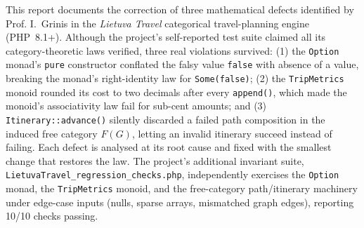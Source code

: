 This report documents the correction of three mathematical defects identified by Prof. I.~Grinis in the \emph{Lietuva Travel} categorical travel-planning engine (PHP~8.1+). Although the project's self-reported test suite claimed all its category-theoretic laws verified, three real violations survived: (1) the \texttt{Option} monad's \texttt{pure} constructor conflated the falsy value \texttt{false} with absence of a value, breaking the monad's right-identity law for \texttt{Some(false)}; (2) the \texttt{TripMetrics} monoid rounded its cost to two decimals after every \texttt{append()}, which made the monoid's associativity law fail for sub-cent amounts; and (3) \texttt{Itinerary::advance()} silently discarded a failed path composition in the induced free category $F(G)$, letting an invalid itinerary succeed instead of failing. Each defect is analysed at its root cause and fixed with the smallest change that restores the law. The project's additional invariant suite, \texttt{LietuvaTravel\_regression\_checks.php}, independently exercises the \texttt{Option} monad, the \texttt{TripMetrics} monoid, and the free-category path/itinerary machinery under edge-case inputs (nulls, sparse arrays, mismatched graph edges), reporting 10/10 checks passing.
